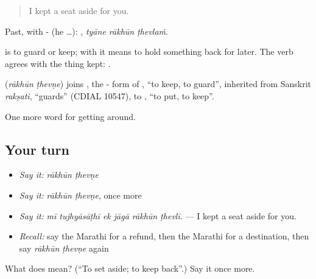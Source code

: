 \begin{quote}
I kept a seat aside for you.
\end{quote}

Past, with - (he …):   , \emph{tyāne rākhūn ṭhevlaṁ}.

 is to guard or keep; with  it means to hold something back for later. The verb agrees with the thing kept:   .

\begin{cousinweb}
\textbf{ } (\emph{rākhūn ṭhevṇe}) joins \textbf{}, the - form of \textbf{}, \textquotedblleft{}to keep, to guard\textquotedblright{}, inherited from Sanskrit \emph{rakṣati}, \textquotedblleft{}guards\textquotedblright{} (CDIAL 10547), to \textbf{}, \textquotedblleft{}to put, to keep\textquotedblright{}.
\end{cousinweb}

\begin{grammarlens}[title={What you've built}]
One more word for getting around.
\end{grammarlens}

\subsection*{Your turn}
\begin{itemize}
\raggedright
  \item \emph{Say it:} \emph{rākhūn ṭhevṇe}
  \item \emph{Say it:} \emph{rākhūn ṭhevṇe}, once more
  \item \emph{Say it:} \emph{mī tujhyāsāṭhī ek jāgā rākhūn ṭhevlī.} — I kept a seat aside for you.
  \item \emph{Recall:} say the Marathi for a refund, then the Marathi for a destination, then say \emph{rākhūn ṭhevṇe} again
\end{itemize}

\begin{tcolorbox}[breakable,colback=teal!4,colframe=teal!35!black,title={Before you move on}]
What does   mean? (\textquotedblleft{}To set aside; to keep back\textquotedblright{}.) Say it once more.
\end{tcolorbox}
